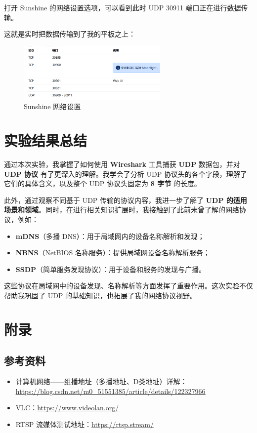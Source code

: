 \documentclass[14pt,a4paper,UTF8,twoside]{article}
\begin{document}
打开 Sunshine 的网络设置选项，可以看到此时 UDP 30911 端口正在进行数据传输。

这就是实时把数据传输到了我的平板之上：

\begin{figure}[H]
    \centering
    \includegraphics[width=0.65\textwidth]{lab5/moonlight.png}
    \caption{Sunshine 网络设置}
\end{figure}

\section{实验结果总结}


通过本次实验，我掌握了如何使用 \textbf{Wireshark} 工具捕获 \textbf{UDP} 数据包，并对 \textbf{UDP 协议} 有了更深入的理解。我学会了分析 UDP 协议头的各个字段，理解了它们的具体含义，以及整个 UDP 协议头固定为 \textbf{8 字节} 的长度。

此外，通过观察不同基于 UDP 传输的协议内容，我进一步了解了 \textbf{UDP 的适用场景和领域}。同时，在进行相关知识扩展时，我接触到了此前未曾了解的网络协议，例如：
\begin{itemize}
    \item \textbf{mDNS}（多播 DNS）：用于局域网内的设备名称解析和发现；
    \item \textbf{NBNS}（NetBIOS 名称服务）：提供局域网设备名称解析服务；
    \item \textbf{SSDP}（简单服务发现协议）：用于设备和服务的发现与广播。
\end{itemize}

这些协议在局域网中的设备发现、名称解析等方面发挥了重要作用。这次实验不仅帮助我巩固了 UDP 的基础知识，也拓展了我的网络协议视野。

\section{附录}

\subsection*{参考资料}

\begin{itemize}
    \item 计算机网络——组播地址（多播地址、D类地址）详解：\href{https://blog.csdn.net/m0_51551385/article/details/122327966}{\underline{https://blog.csdn.net/m0\_51551385/article/details/122327966}}
    \item VLC：\href{https://www.videolan.org/}{\underline{https://www.videolan.org/}}
    \item RTSP 流媒体测试地址：\href{https://rtsp.stream/}{\underline{https://rtsp.stream/}}
\end{itemize}
\end{document}
